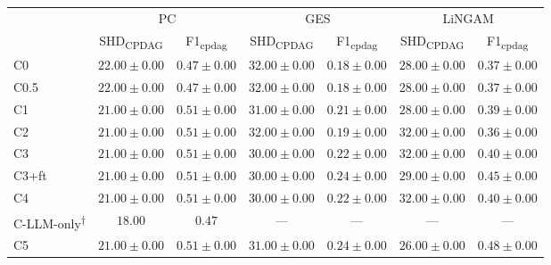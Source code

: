 \begin{tabular}{l|cc|cc|cc}
\hline
 & \multicolumn{2}{c|}{PC} & \multicolumn{2}{c|}{GES} & \multicolumn{2}{c}{LiNGAM} \\
 & SHD\textsubscript{CPDAG} & F1\textsubscript{cpdag} & SHD\textsubscript{CPDAG} & F1\textsubscript{cpdag} & SHD\textsubscript{CPDAG} & F1\textsubscript{cpdag} \\
\hline
C0 & $22.00 \pm 0.00$ & $0.47 \pm 0.00$ & $32.00 \pm 0.00$ & $0.18 \pm 0.00$ & $28.00 \pm 0.00$ & $0.37 \pm 0.00$ \\
C0.5 & $22.00 \pm 0.00$ & $0.47 \pm 0.00$ & $32.00 \pm 0.00$ & $0.18 \pm 0.00$ & $28.00 \pm 0.00$ & $0.37 \pm 0.00$ \\
C1 & $21.00 \pm 0.00$ & $0.51 \pm 0.00$ & $31.00 \pm 0.00$ & $0.21 \pm 0.00$ & $28.00 \pm 0.00$ & $0.39 \pm 0.00$ \\
C2 & $21.00 \pm 0.00$ & $0.51 \pm 0.00$ & $32.00 \pm 0.00$ & $0.19 \pm 0.00$ & $32.00 \pm 0.00$ & $0.36 \pm 0.00$ \\
C3 & $21.00 \pm 0.00$ & $0.51 \pm 0.00$ & $30.00 \pm 0.00$ & $0.22 \pm 0.00$ & $32.00 \pm 0.00$ & $0.40 \pm 0.00$ \\
C3+ft & $21.00 \pm 0.00$ & $0.51 \pm 0.00$ & $30.00 \pm 0.00$ & $0.24 \pm 0.00$ & $29.00 \pm 0.00$ & $0.45 \pm 0.00$ \\
C4 & $21.00 \pm 0.00$ & $0.51 \pm 0.00$ & $30.00 \pm 0.00$ & $0.22 \pm 0.00$ & $32.00 \pm 0.00$ & $0.40 \pm 0.00$ \\
C-LLM-only\textsuperscript{$\dagger$} & $18.00$ & $0.47$ & --- & --- & --- & --- \\ %
C5 & $21.00 \pm 0.00$ & $0.51 \pm 0.00$ & $31.00 \pm 0.00$ & $0.24 \pm 0.00$ & $26.00 \pm 0.00$ & $0.48 \pm 0.00$ \\
\hline
\end{tabular}
